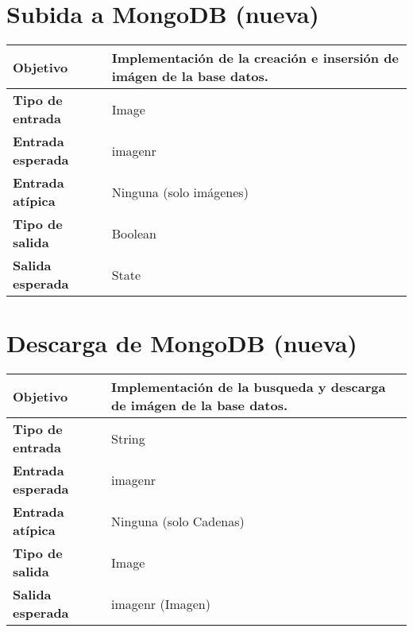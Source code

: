 \documentclass{scrreprt}
\begin{document}
\section{Subida a MongoDB (nueva)}
\vspace{0.3cm}
\begin{center}
    \begin{tabular}{|p{4.0cm}|p{9.0cm}|}
        \hline
	    \textbf{Objetivo} & Implementación de la creación e insersión de imágen de la base datos.\\
        \hline
	    \textbf{Tipo de entrada} & Image \\
        \hline
	    \textbf{Entrada esperada} & imagenr \\
        \hline
	    \textbf{Entrada atípica} & Ninguna (solo imágenes) \\
        \hline
	    \textbf{Tipo de salida} & Boolean \\
        \hline
	    \textbf{Salida esperada} & State \\
        \hline        
    \end{tabular}
\end{center}

\section{Descarga de MongoDB (nueva)}
\vspace{0.3cm}
\begin{center}
    \begin{tabular}{|p{4.0cm}|p{9.0cm}|}
        \hline
	    \textbf{Objetivo} & Implementación de la busqueda y descarga de imágen de la base datos. \\
        \hline
	    \textbf{Tipo de entrada} & String \\
        \hline
	    \textbf{Entrada esperada} & imagenr \\
        \hline
	    \textbf{Entrada atípica} & Ninguna (solo Cadenas) \\
        \hline
	    \textbf{Tipo de salida} & Image \\
        \hline
	    \textbf{Salida esperada} & imagenr (Imagen) \\
        \hline        
    \end{tabular}
\end{center}
\end{document}
